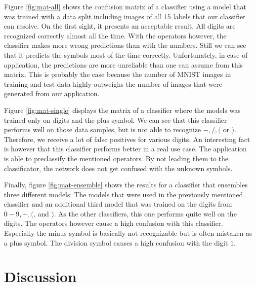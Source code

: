 \documentclass[12pt]{article}
\begin{document}
	Figure \ref{fig:mat-all} shows the confusion matrix of a classifier using a model that was trained with a data split including images of all 15 labels that our classifier can resolve. On the first sight, it presents an acceptable result. All digits are recognized correctly almost all the time. With the operators however, the classifier makes more wrong predictions than with the numbers. Still we can see that it predicts the symbols most of the time correctly. Unfortunately, in case of application, the predictions are more unreliable than one can assume from this matrix. This is probably the case because the number of MNIST images in training and test data highly outweighs the number of images that were generated from our application.
	
	Figure \ref{fig:mat-single} displays the matrix of a classifier where the models was trained only on digits and the plus symbol. We can see that this classifier performs well on those data samples, but is not able to recognize $-, /, ($ or $)$. Therefore, we receive a lot of false positives for various digits. An interesting fact is however that this classifier performs better in a real use case. The application is able to preclassify the mentioned operators. By not leading them to the classificator, the network does not get confused with the unknown symbols.
	
	Finally, figure \ref{fig:mat-ensemble} shows the results for a classifier that ensembles three different models: The models that were used in the previously mentioned classifier and an additional third model that was trained on the digits from $0-9, +, ($, and $)$. As the other classifiers, this one performs quite well on the digits. The operators however cause a high confusion with this classifier. Especially the minus symbol is basically not recognizable but is often mistaken as a plus symbol. The division symbol causes a high confusion with the digit $1$.
	
	\newpage

	\section{Discussion}
	
\end{document}
